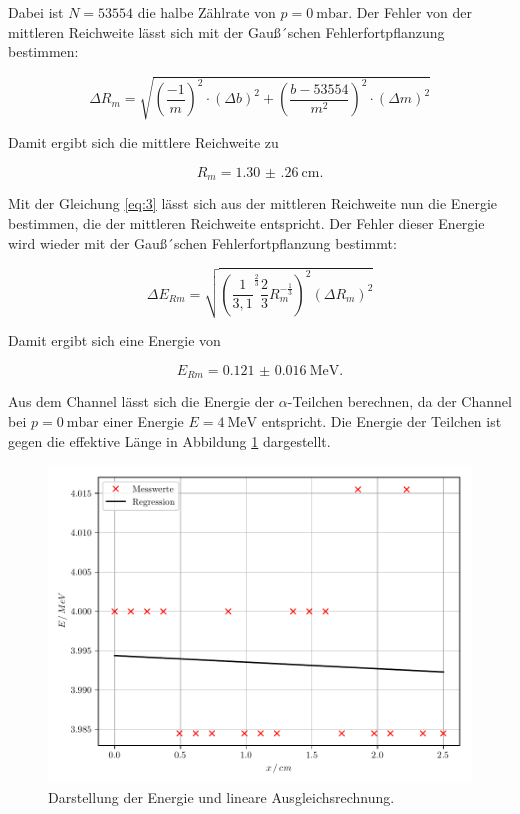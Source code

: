Dabei ist $N = 53554$ die halbe Zählrate von $p = \SI{0}{\milli\bar}$.
Der Fehler von der mittleren Reichweite lässt sich mit der Gauß´schen Fehlerfortpflanzung
bestimmen:

\begin{equation*}
  \Delta R_m = \sqrt{\left( \frac{-1}{m} \right)^2 \cdot (\Delta b)^2 +
  \left( \frac{b-53554}{m^2} \right)^2 \cdot (\Delta m )^2}
\end{equation*}

Damit ergibt sich die mittlere Reichweite zu

\begin{equation*}
  R_m = \SI{1.30(26)}{\centi\meter}.
\end{equation*}

Mit der Gleichung \ref{eq:3} lässt sich aus der mittleren Reichweite nun die Energie
bestimmen, die der mittleren Reichweite entspricht. Der Fehler dieser Energie wird
wieder mit der Gauß´schen Fehlerfortpflanzung bestimmt:

\begin{equation*}
  \Delta E_{Rm} = \sqrt{\left( \frac{1}{3,1}^{\frac{2}{3}}\frac{2}{3} R_m^{-\frac{1}{3}} \right)^2
  (\Delta R_m)^2}
\end{equation*}

Damit ergibt sich eine Energie von

\begin{equation*}
  E_{Rm} = \SI{0.121(16)}{\mega\eV}.
\end{equation*}

Aus dem Channel lässt sich die Energie der $\alpha$-Teilchen berechnen, da der
Channel bei $p = \SI{0}{\milli\bar}$ einer Energie $E = \SI{4}{\mega\eV}$
entspricht. Die Energie der Teilchen ist gegen die effektive Länge in
Abbildung \ref{abb:3} dargestellt.

\begin{figure}[H]
  \centering
  \includegraphics{plot2.pdf}
  \caption{Darstellung der Energie und lineare Ausgleichsrechnung.}
  \label{abb:3}
\end{figure}

